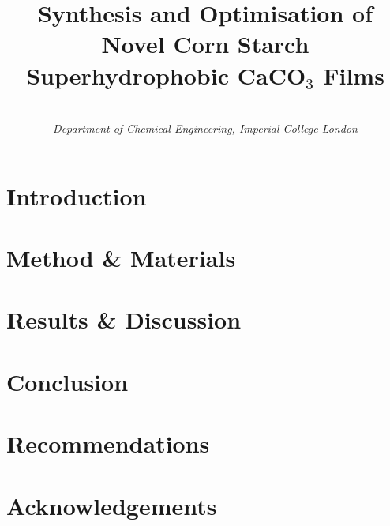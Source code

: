 \documentclass[twoside,twocolumn]{article}
\title{Synthesis and Optimisation of Novel Corn Starch Superhydrophobic CaCO$_3$ Films} %
\author{%
\text{Dhylan Mistry \& Shav Vimalendiran }%
\\[1ex] %
\normalsize \emph{Department of Chemical Engineering, Imperial College London}\\ %
}
\date{} %
\begin{document}
\maketitle


\section{Introduction}



\section{Method \& Materials}



\section{Results \& Discussion}



%
\section{Conclusion}


\section{Recommendations}

\section{Acknowledgements}





\begingroup

\endgroup




\end{document}
